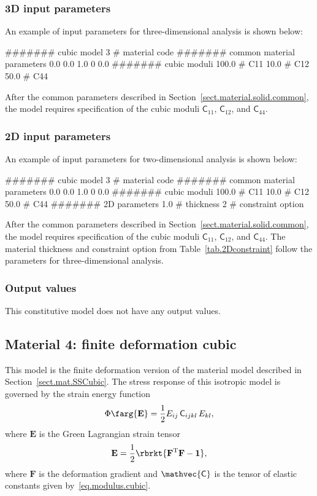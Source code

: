 \subsubsection{3D input parameters}
An example of input parameters for three-dimensional analysis is shown 
below:
\begin{inputfile}
####### cubic model
3     # material code
####### common material parameters
0.0    0.0    1.0
0      0.0
####### cubic moduli
100.0 # C11
 10.0 # C12
 50.0 # C44
\end{inputfile}
After the common parameters described in 
Section~\ref{sect.material.solid.common}, the 
model requires specification of the cubic moduli
$\mathsf{C}_{11}$, $\mathsf{C}_{12}$, and
$\mathsf{C}_{44}$.

\subsubsection{2D input parameters}
An example of input parameters for two-dimensional analysis is shown 
below:
\begin{inputfile}
####### cubic model
3     # material code
####### common material parameters
0.0    0.0    1.0
0      0.0
####### cubic moduli
100.0 # C11
 10.0 # C12
 50.0 # C44
####### 2D parameters
1.0   # thickness
2     # constraint option
\end{inputfile}
After the common parameters described in 
Section~\ref{sect.material.solid.common}, the 
model requires specification of the cubic moduli
$\mathsf{C}_{11}$, $\mathsf{C}_{12}$, and
$\mathsf{C}_{44}$.
The material thickness and 
constraint option from Table~\ref{tab.2Dconstraint} 
follow the parameters for three-dimensional analysis.

\subsubsection{Output values}
This constitutive model does not have any output values.

\subsection{Material 4: finite deformation cubic}
\label{sect.mat.FDCubic}
This model is the finite deformation version of the material model
described in Section~\ref{sect.mat.SSCubic}.
The stress response of this isotropic model is 
governed by the strain energy function
\begin{equation}
\Phi\farg{\mathbf{E}}=
\frac{1}{2} E_{ij}\,\mathsf{C}_{ijkl}\,E_{kl},
\end{equation}
where $\mathbf{E}$ is the Green Lagrangian strain tensor
\begin{equation}
	\mathbf{E} = \frac{1}{2}\rbrkt{
	\mathbf{F}^{\text{T}}\mathbf{F} - \mathbf{1}},
\end{equation}
where $\mathbf{F}$ is the deformation gradient
and $\mathvec{\mathsf{C}}$ is the tensor of 
elastic constants given by~\eqref{eq.modulus.cubic}.

